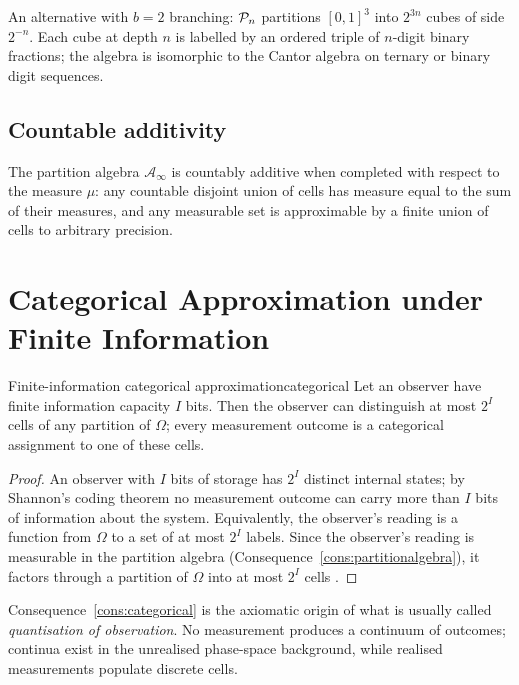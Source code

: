 An alternative with $b=2$ branching: $\mathcal{P}_{n}$ partitions $[0,1]^{3}$ into $2^{3n}$ cubes of side $2^{-n}$. Each cube at depth $n$ is labelled by an ordered triple of $n$-digit binary fractions; the algebra is isomorphic to the Cantor algebra on ternary or binary digit sequences.

\subsection{Countable additivity}

The partition algebra $\mathcal{A}_{\infty}$ is countably additive when completed with respect to the measure $\mu$: any countable disjoint union of cells has measure equal to the sum of their measures, and any measurable set is approximable by a finite union of cells to arbitrary precision.

\section{Categorical Approximation under Finite Information}
\label{sec:categoricalapprox}

\begin{consequence}{Finite-information categorical approximation}{categorical}
Let an observer have finite information capacity $I$ bits. Then the observer can distinguish at most $2^{I}$ cells of any partition of $\Omega$; every measurement outcome is a categorical assignment to one of these cells.
\end{consequence}

\begin{proof}
An observer with $I$ bits of storage has $2^{I}$ distinct internal states; by Shannon's coding theorem \citep{shannon1948} no measurement outcome can carry more than $I$ bits of information about the system. Equivalently, the observer's reading is a function from $\Omega$ to a set of at most $2^{I}$ labels. Since the observer's reading is measurable in the partition algebra (Consequence~\ref{cons:partitionalgebra}), it factors through a partition of $\Omega$ into at most $2^{I}$ cells \citep{landauer1961}.
\end{proof}

\begin{remark}
Consequence~\ref{cons:categorical} is the axiomatic origin of what is usually called \emph{quantisation of observation}. No measurement produces a continuum of outcomes; continua exist in the unrealised phase-space background, while realised measurements populate discrete cells.
\end{remark}

